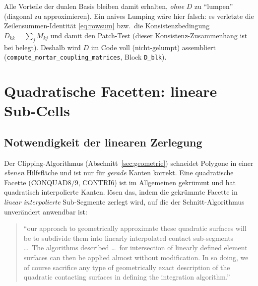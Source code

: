 \documentclass[a4paper,11pt]{article}
\def\bm#1{#1}%
\def\tilde#1{#1}%
\newcommand{\code}[1]{\texttt{\small #1}}
\let\stdsection\section
\renewcommand{\section}{\clearpage\stdsection}
\begin{document}
\medskip
\noindent Alle Vorteile der dualen Basis bleiben damit erhalten, \emph{ohne} $\bm D$ zu ``lumpen''
(diagonal zu approximieren). Ein naives Lumping wäre hier falsch: es verletzte die
Zeilensummen-Identität \eqref{eq:rowsum} bzw.\ die Konsistenzbedingung $\tilde D_{kk}=\sum_j M_{kj}$
und damit den Patch-Test (dieser Konsistenz-Zusammenhang ist bei \citet[Abschn.~4.1]{cichosz}
belegt). Deshalb wird $\bm D$ im Code voll (nicht-gelumpt) assembliert
(\code{compute\_mortar\_coupling\_matrices}, Block \code{D\_blk}).

\section{Quadratische Facetten: lineare Sub-Cells}
\label{sec:subcells}

\subsection{Notwendigkeit der linearen Zerlegung}
Der Clipping-Algorithmus (Abschnitt~\ref{sec:geometrie}) schneidet Polygone in einer \emph{ebenen}
Hilfsfläche und ist nur für \emph{gerade} Kanten korrekt. Eine quadratische Facette (CONQUAD8/9,
CONTRI6) ist im Allgemeinen gekrümmt und hat quadratisch interpolierte Kanten.
\citet{puso2008} lösen das, indem die gekrümmte Facette in \emph{linear interpolierte} Sub-Segmente
zerlegt wird, auf die der Schnitt-Algorithmus unverändert anwendbar ist:
\begin{quote}
\small ``our approach to geometrically approximate these quadratic surfaces will be to subdivide them
into linearly interpolated contact sub-segments \ldots\ The algorithms described \ldots\ for
intersection of linearly defined element surfaces can then be applied almost without modification. In
so doing, we of course sacrifice any type of geometrically exact description of the quadratic
contacting surfaces in defining the integration algorithm.'' \hfill \citep[S.~560--561]{puso2008}
\end{quote}
\end{document}
